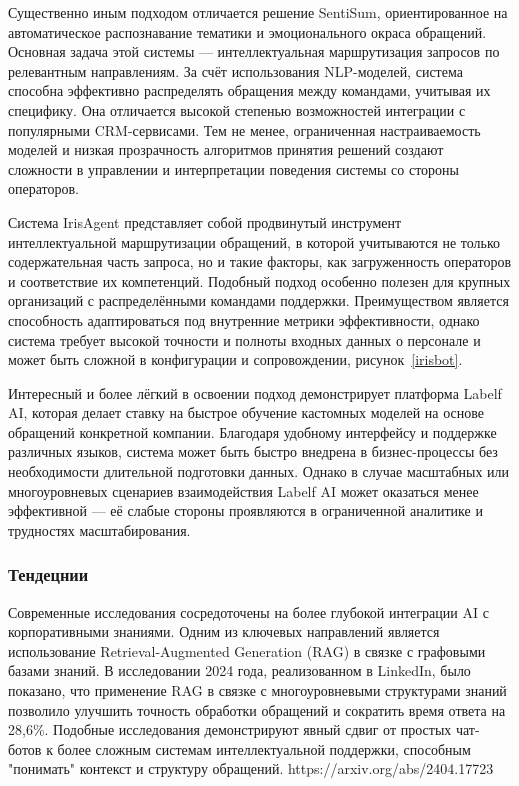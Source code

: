 Существенно иным подходом отличается решение SentiSum\cite{SentiSum}, ориентированное на автоматическое распознавание тематики и эмоционального окраса обращений. Основная задача этой системы — интеллектуальная маршрутизация запросов по релевантным направлениям. За счёт использования NLP-моделей, система способна эффективно распределять обращения между командами, учитывая их специфику. Она отличается высокой степенью возможностей интеграции с популярными CRM-сервисами. Тем не менее, ограниченная настраиваемость моделей и низкая прозрачность алгоритмов принятия решений создают сложности в управлении и интерпретации поведения системы со стороны операторов.

Система IrisAgent представляет собой продвинутый инструмент интеллектуальной маршрутизации обращений, в которой учитываются не только содержательная часть запроса, но и такие факторы, как загруженность операторов и соответствие их компетенций. Подобный подход особенно полезен для крупных организаций с распределёнными командами поддержки. Преимуществом является способность адаптироваться под внутренние метрики эффективности, однако система требует высокой точности и полноты входных данных о персонале и может быть сложной в конфигурации и сопровождении, рисунок~\ref{irisbot}.


Интересный и более лёгкий в освоении подход демонстрирует платформа Labelf AI\cite{Labelf}, которая делает ставку на быстрое обучение кастомных моделей на основе обращений конкретной компании. Благодаря удобному интерфейсу и поддержке различных языков, система может быть быстро внедрена в бизнес-процессы без необходимости длительной подготовки данных. Однако в случае масштабных или многоуровневых сценариев взаимодействия Labelf AI может оказаться менее эффективной — её слабые стороны проявляются в ограниченной аналитике и трудностях масштабирования.

\subsubsection{Тендецнии}

Современные исследования сосредоточены на более глубокой интеграции AI с корпоративными знаниями. Одним из ключевых направлений является использование Retrieval-Augmented Generation (RAG) в связке с графовыми базами знаний. В исследовании 2024 года, реализованном в LinkedIn, было показано, что применение RAG в связке с многоуровневыми структурами знаний позволило улучшить точность обработки обращений и сократить время ответа на 28,6\%. Подобные исследования демонстрируют явный сдвиг от простых чат-ботов к более сложным системам интеллектуальной поддержки, способным "понимать" контекст и структуру обращений.
https://arxiv.org/abs/2404.17723

